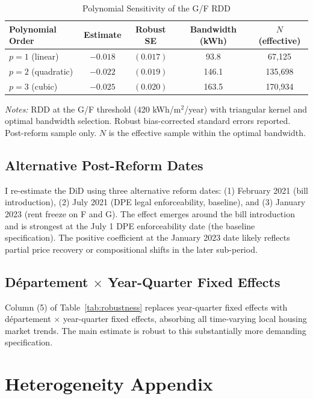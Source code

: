 \documentclass[12pt]{article}
\begin{document}
\begin{table}[H]
\centering
\caption{Polynomial Sensitivity of the G/F RDD}
\label{tab:poly}
\begin{tabular}{lcccc}
\toprule
Polynomial Order & Estimate & Robust SE & Bandwidth (kWh) & $N$ (effective) \\
\midrule
$p = 1$ (linear) & $-0.018$ & $(0.017)$ & 93.8 & 67,125 \\
$p = 2$ (quadratic) & $-0.022$ & $(0.019)$ & 146.1 & 135,698 \\
$p = 3$ (cubic) & $-0.025$ & $(0.020)$ & 163.5 & 170,934 \\
\bottomrule
\end{tabular}
\begin{tablenotes}
\small
\item \textit{Notes:} RDD at the G/F threshold (420 kWh/m$^2$/year) with triangular kernel and optimal bandwidth selection. Robust bias-corrected standard errors reported. Post-reform sample only. $N$ is the effective sample within the optimal bandwidth.
\end{tablenotes}
\end{table}

\subsection{Alternative Post-Reform Dates}

I re-estimate the DiD using three alternative reform dates: (1) February 2021 (bill introduction), (2) July 2021 (DPE legal enforceability, baseline), and (3) January 2023 (rent freeze on F and G). The effect emerges around the bill introduction and is strongest at the July 1 DPE enforceability date (the baseline specification). The positive coefficient at the January 2023 date likely reflects partial price recovery or compositional shifts in the later sub-period.

\subsection{D\'epartement $\times$ Year-Quarter Fixed Effects}

Column (5) of Table~\ref{tab:robustness} replaces year-quarter fixed effects with d\'epartement $\times$ year-quarter fixed effects, absorbing all time-varying local housing market trends. The main estimate is robust to this substantially more demanding specification.


\section{Heterogeneity Appendix}
\label{sec:het_appendix}
\end{document}
